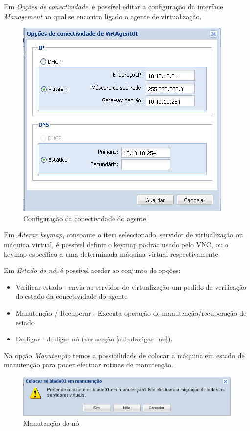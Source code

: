 Em \emph{Opções de conectividade}, é possível editar a configuração da interface \emph{Management} ao qual se encontra ligado o agente de virtualização.
\begin{figure}[H]
	\begin{center}
	\includegraphics[scale=0.5]{screenshots/node_conn.png}
	\caption{Configuração da conectividade do agente}
	\label{fig:node_conn}
	\end{center}
\end{figure}

Em \emph{Alterar keymap}, consoante o item seleccionado, servidor de virtualização ou máquina virtual, é possível definir o keymap padrão usado pelo VNC, ou o keymap específico a uma determinada máquina virtual respectivamente.

Em \emph{Estado do nó}, é possível aceder ao conjunto de opções:
\begin{itemize}
    \item Verificar estado - envia ao servidor de virtualização um pedido de verificação do estado da conectividade do agente
    \item Manutenção / Recuperar - Executa operação de manutenção/recuperação de estado 
    \item Desligar - desligar nó (ver secção \ref{sub:desligar_no}).
\end{itemize}

Na opção \emph{Manutenção} temos a possibilidade de colocar a máquina em estado de manutenção para poder efectuar rotinas de manutenção.
\begin{figure}[H]
	\begin{center}
	\includegraphics[scale=0.45]{screenshots/node_maintenance.png}
	\caption{Manutenção do nó}
	\label{fig:node_maintenance}
	\end{center}
\end{figure}

